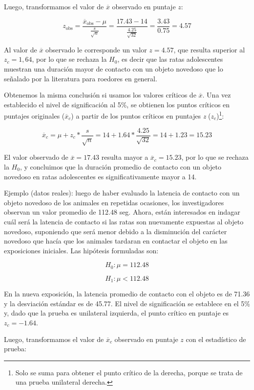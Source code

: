 \documentclass[]{book}
\let\rmarkdownfootnote\footnote%
\def\footnote{\protect\rmarkdownfootnote}
\begin{document}
Luego, transformamos el valor de \(\overline{x}\) observado en puntaje
\(z\):

\[z_{\text{obs}} = \frac{{\overline{x}}_{\text{obs}} - \mu}{\frac{s}{\sqrt{n}}} = \frac{17.43 - 14}{\frac{4.25}{\sqrt{32}}} = \frac{3.43}{0.75} = 4.57\]

Al valor de \(\overline{x}\) observado le corresponde un valor \(z=4.57\),
que resulta superior al \(z_c = 1,64\), por lo que se rechaza la \(H_0\), es
decir que las ratas adolescentes muestran una duración mayor de contacto
con un objeto novedoso que lo señalado por la literatura para roedores
en general.

Obtenemos la misma conclusión si usamos los valores críticos de
\(\overline{x}\). Una vez establecido el nivel de significación al 5\%, se
obtienen los puntos críticos en puntajes originales
(\({\overline{x}}_{c}\)) a partir de los puntos críticos en puntajes \emph{z}
(\(z_{c}\))\footnote{Solo se suma para obtener el punto crítico de la derecha, porque se trata de una prueba unilateral derecha.}:

\[{\overline{x}}_{c} = \mu + z_{c}*\frac{s}{\sqrt{n}} = 14 + 1.64*\frac{4.25}{\sqrt{32}} = 14 + 1.23 = 15.23\]

El valor observado de \(\overline{x} = 17.43\) resulta mayor a
\({\overline{x}}_{c} = 15.23\), por lo que se rechaza la \(H_{0}\), y
concluimos que la duración promedio de contacto con un objeto novedoso
en ratas adolescentes es significativamente mayor a 14.

Ejemplo (datos reales): luego de haber evaluado la latencia de contacto
con un objeto novedoso de los animales en repetidas ocasiones, los
investigadores observan un valor promedio de 112.48 seg. Ahora, están
interesados en indagar cuál será la latencia de contacto si las ratas
son nuevamente expuestas al objeto novedoso, suponiendo que será menor
debido a la disminución del carácter novedoso que hacía que los animales
tardaran en contactar el objeto en las exposiciones iniciales. Las
hipótesis formuladas son:

\[H_{0}:\mu = 112.48\]

\[H_{1}:\mu < 112.48\]

En la nueva exposición, la latencia promedio de contacto con el objeto
es de 71.36 y la desviación estándar es de 45.77. El nivel de
significación se establece en el 5\% y, dado que la prueba es unilateral
izquierda, el punto crítico en puntaje es \(z_{c}=-1.64\).

Luego, transformamos el valor de \({\overline{x}}_{c}\) observado en
puntaje \(z\) con el estadístico de prueba:
\end{document}
